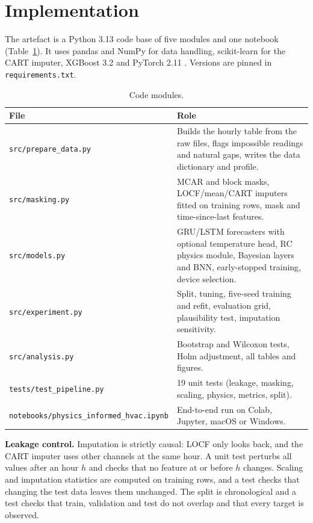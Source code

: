 \section{Implementation}\label{sec:impl}

The artefact is a Python 3.13 code base of five modules and one notebook (Table~\ref{tab:modules}). It uses pandas and NumPy for data handling, scikit-learn \citep{pedregosa2011sklearn} for the CART imputer, XGBoost 3.2 \citep{chen2016xgboost} and PyTorch 2.11 \citep{paszke2019pytorch}. Versions are pinned in \texttt{requirements.txt}.

\begin{table}[H]
\centering\small
\caption{Code modules.}\label{tab:modules}
\begin{tabular}{p{5.6cm}p{9.2cm}}
\toprule
File & Role \\
\midrule
\texttt{src/prepare\_data.py} & Builds the hourly table from the raw files, flags impossible readings and natural gaps, writes the data dictionary and profile. \\
\texttt{src/masking.py} & MCAR and block masks, LOCF/mean/CART imputers fitted on training rows, mask and time-since-last features. \\
\texttt{src/models.py} & GRU/LSTM forecasters with optional temperature head, RC physics module, Bayesian layers and BNN, early-stopped training, device selection. \\
\texttt{src/experiment.py} & Split, tuning, five-seed training and refit, evaluation grid, plausibility test, imputation sensitivity. \\
\texttt{src/analysis.py} & Bootstrap and Wilcoxon tests, Holm adjustment, all tables and figures. \\
\texttt{tests/test\_pipeline.py} & 19 unit tests (leakage, masking, scaling, physics, metrics, split). \\
\texttt{notebooks/}\newline\texttt{physics\_informed\_hvac.ipynb} & End-to-end run on Colab, Jupyter, macOS or Windows. \\
\bottomrule
\end{tabular}
\end{table}

\textbf{Leakage control.} Imputation is strictly causal: LOCF only looks back, and the CART imputer uses other channels at the same hour. A unit test perturbs all values after an hour $h$ and checks that no feature at or before $h$ changes. Scaling and imputation statistics are computed on training rows, and a test checks that changing the test data leaves them unchanged. The split is chronological and a test checks that train, validation and test do not overlap and that every target is observed.

